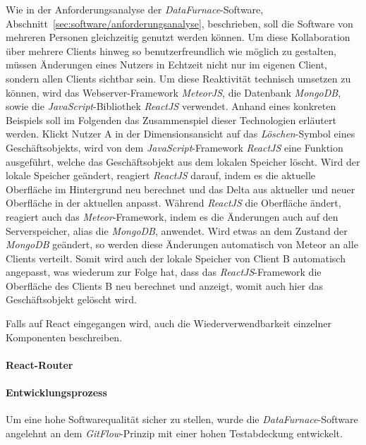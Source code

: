\documentclass[
  language=german, %
  type=bachelor%
]{isthesis}
\begin{document}
\begin{content}
  Wie in der Anforderungsanalyse der \textit{DataFurnace}-Software,
  Abschnitt~\ref{sec:software/anforderungsanalyse}, beschrieben, soll die
  Software von mehreren Personen gleichzeitig genutzt werden können. Um diese
  Kollaboration über mehrere Clients hinweg so benutzerfreundlich wie möglich
  zu gestalten, müssen Änderungen eines Nutzers in Echtzeit nicht nur im
  eigenen Client, sondern allen Clients sichtbar sein. Um diese Reaktivität
  technisch umsetzen zu können, wird das Webserver-Framework \textit{MeteorJS},
  die Datenbank \textit{MongoDB}, sowie die \textit{JavaScript}-Bibliothek
  \textit{ReactJS} verwendet. Anhand eines konkreten Beispiels soll im
  Folgenden das Zusammenspiel dieser Technologien erläutert werden. Klickt
  Nutzer A in der Dimensionsansicht auf das \textit{Löschen}-Symbol eines
  Geschäftsobjekts, wird von dem \textit{JavaScript}-Framework \textit{ReactJS}
  eine Funktion ausgeführt, welche das Geschäftsobjekt aus dem lokalen Speicher
  löscht. Wird der lokale Speicher geändert, reagiert \textit{ReactJS} darauf,
  indem es die aktuelle Oberfläche im Hintergrund neu berechnet und das Delta
  aus aktueller und neuer Oberfläche in der aktuellen anpasst. Während
  \textit{ReactJS} die Oberfläche ändert, reagiert auch das
  \textit{Meteor}-Framework, indem es
  die Änderungen auch auf den Serverspeicher, alias die \textit{MongoDB},
  anwendet. Wird etwas an dem Zustand der \textit{MongoDB} geändert, so werden
  diese Änderungen automatisch von Meteor an alle Clients verteilt. Somit wird
  auch der lokale Speicher von Client B automatisch angepasst, was wiederum zur
  Folge hat, dass das \textit{ReactJS}-Framework die Oberfläche des Clients B
  neu berechnet und anzeigt, womit auch hier das Geschäftsobjekt gelöscht wird.

  Falls auf React eingegangen wird, auch die Wiederverwendbarkeit einzelner Komponenten beschreiben.

  \paragraph{React-Router}

  \paragraph{Entwicklungsprozess} Um eine hohe Softwarequalität sicher zu
  stellen, wurde die \textit{DataFurnace}-Software angelehnt an dem
  \textit{GitFlow}-Prinzip mit einer hohen Testabdeckung entwickelt.
  

\end{content}
\end{document}
